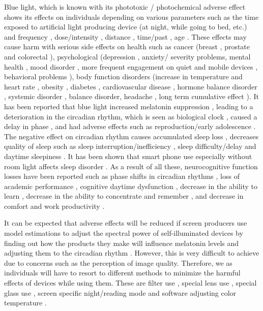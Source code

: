 \documentclass{article}
\begin{document}
Blue light, which is known with its phototoxic \cite{ohagan2016} / photochemical \cite{rebec2015} adverse effect shows its effects on individuals depending on various parameters such as the time exposed to artificial light producing device (at night, while going to bed, etc.) \cite{mineshita2020} and frequency \cite{organisciak1989retinal}, dose/intensity \cite{rebec2015}, distance \cite{yoshimura2017}, time/past \cite{alim2016transient}, age \cite{lee2018}. These effects may cause harm with serious side effects on health such as cancer (breast \cite{fang2016}, prostate and colorectal \cite{smolensky2015nocturnal}), psychological (depression \cite{maras2015}, anxiety/ severity \cite{maras2015} problems, mental health \cite{grandner2017sleep}, mood disorder \cite{lazzerini2017mood}, more frequent engagement on quiet and mobile devices \cite{aziz2018}, behavioral problems \cite{touitou2016disruption}), body function disorders (increase in temperature and heart rate \cite{kim2019}, obesity \cite{mineshita2020}, diabetes \cite{fang2016}, cardiovascular disease \cite{grandner2017sleep}, hormone balance disorder \cite{gabel2017differential}, systemic disorder \cite{turner2010role}, balance disorder, headache \cite{domingues2017clinical}, long term cumulative effect \cite{algvere2006age}). It has been reported that blue light increased melatonin suppression \cite{kozakov2008}, leading to a deterioration in the circadian rhythm, which is seen as biological clock \cite{ostrin2017}, caused a delay in phase \cite{wahl2019}, and had adverse effects such as reproduction/early adolescence \cite{fang2016}. The negative effect on circadian rhythm causes accumulated sleep loss \cite{turner2010role}, decreases quality of sleep such as sleep interruption/inefficiency \cite{gabel2017differential}, sleep difficulty/delay \cite{domingues2017clinical} and daytime sleepiness \cite{touitou2016disruption}. It has been shown that smart phone use especially without room light affects sleep disorder \cite{munezawa2011}. As a result of all these, neurocognitive function losses have been reported \cite{grandner2017sleep} such as phase shifts in circadian rhythms \cite{lockley2003}, loss of academic performance \cite{touitou2016disruption}, cognitive daytime dysfunction \cite{cajochen2011}, decrease in the ability to learn \cite{mineshita2020}, decrease in the ability to concentrate and remember \cite{cohen2011}, and decrease in comfort and work productivity \cite{anshel2007}.

It can be expected that adverse effects will be reduced if screen producers use model estimations to adjust the spectral power of self-illuminated devices by finding out how the products they make will influence melatonin levels and adjusting them to the circadian rhythm \cite{wood2012}. However, this is very difficult to achieve due to concerns such as the perception of image quality. Therefore, we as individuals will have to resort to different methods to minimize the harmful effects of devices while using them. These are filter use \cite{heiting2020}, special lens use \cite{sano2014}, special glass use \cite{heiting2020}, screen specific night/reading mode \cite{teran2020} and software adjusting color temperature \cite{sanz2020}.
\end{document}
